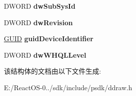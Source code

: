 \begin{DoxyCompactItemize}
\mbox{\label{structtag_d_d_d_e_v_i_c_e_i_d_e_n_t_i_f_i_e_r2_aeb168ca257a5c29a6bc1fe13f1302575}} 
D\+W\+O\+RD {\bfseries dw\+Sub\+Sys\+Id}
\item 
\mbox{\label{structtag_d_d_d_e_v_i_c_e_i_d_e_n_t_i_f_i_e_r2_a803ce64f4f3d9a04293b6ab1ba6f9d2e}} 
D\+W\+O\+RD {\bfseries dw\+Revision}
\item 
\mbox{\label{structtag_d_d_d_e_v_i_c_e_i_d_e_n_t_i_f_i_e_r2_a1a9fdfbc09f43e7598237e708c787fc0}} 
\hyperlink{interface_g_u_i_d}{G\+U\+ID} {\bfseries guid\+Device\+Identifier}
\item 
\mbox{\label{structtag_d_d_d_e_v_i_c_e_i_d_e_n_t_i_f_i_e_r2_a34c8022b7f8f33c1db77ba19ff956d3f}} 
D\+W\+O\+RD {\bfseries dw\+W\+H\+Q\+L\+Level}
\end{DoxyCompactItemize}


该结构体的文档由以下文件生成\+:\begin{DoxyCompactItemize}
\item 
E\+:/\+React\+O\+S-\/0../sdk/include/psdk/ddraw.\+h\end{DoxyCompactItemize}
